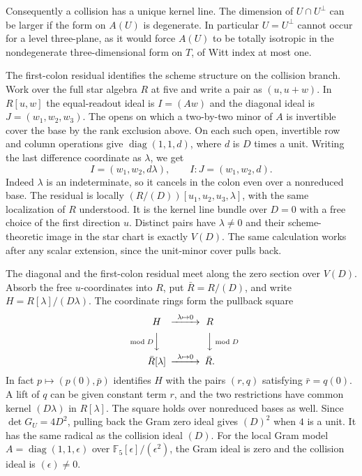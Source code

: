Consequently a collision has a unique kernel line. The dimension
of \(U\cap U^\perp\) can be larger if the form on \(A(U)\) is
degenerate. In particular \(U=U^\perp\) cannot occur for a level
three-plane, as it would force \(A(U)\) to be totally isotropic
in the nondegenerate three-dimensional form on \(T\), of Witt
index at most one.

The first-colon residual identifies the scheme structure on the
collision branch. Work over the full star algebra \(R\) at five
and write a pair as \((u,u+w)\). In \(R[u,w]\) the equal-readout
ideal is \(I=(Aw)\) and the diagonal ideal is \(J=(w_1,w_2,w_3)\).
The opens on which a two-by-two minor of \(A\) is invertible
cover the base by the rank exclusion above. On each such open,
invertible row and column operations give
\(\operatorname{diag}(1,1,d)\), where \(d\) is \(D\) times a unit.
Writing the last difference coordinate as \(\lambda\), we get
\[
 I=(w_1,w_2,d\lambda),\qquad I:J=(w_1,w_2,d).
\]
Indeed \(\lambda\) is an indeterminate, so it cancels in the
colon even over a nonreduced base. The residual is locally
\((R/(D))[u_1,u_2,u_3,\lambda]\), with the same localization of
\(R\) understood. It is the kernel line bundle over \(D=0\)
with a free choice of the first direction \(u\). Distinct pairs
have \(\lambda\ne0\) and their scheme-theoretic image in the
star chart is exactly \(V(D)\). The same calculation works after
any scalar extension, since the unit-minor cover pulls back.

The diagonal and the first-colon residual meet along the zero section
over \(V(D)\). Absorb the free \(u\)-coordinates into \(R\), put
\(\bar R=R/(D)\), and write \(H=R[\lambda]/(D\lambda)\).
The coordinate rings form the pullback square
\[
\begin{CD}
 H @>{\lambda\mapsto 0}>> R\\
 @V{\bmod D}VV @VV{\bmod D}V\\
 \bar R[\lambda] @>{\lambda\mapsto 0}>> \bar R .
\end{CD}
\]
In fact \(p\mapsto(p(0),\bar p)\) identifies \(H\) with the pairs
\((r,q)\) satisfying \(\bar r=q(0)\). A lift of \(q\) can be given
constant term \(r\), and the two restrictions have common kernel
\((D\lambda)\) in \(R[\lambda]\). The square holds over nonreduced
bases as well. Since \(\det G_U=4D^2\), pulling back the Gram zero
ideal gives \((D)^2\) when \(4\) is a unit. It has the same radical
as the collision ideal \((D)\). For the local Gram model
\(A=\operatorname{diag}(1,1,\epsilon)\) over
\(\mathbb F_5[\epsilon]/(\epsilon^2)\), the Gram ideal is zero
and the collision ideal is \((\epsilon)\ne0\).

